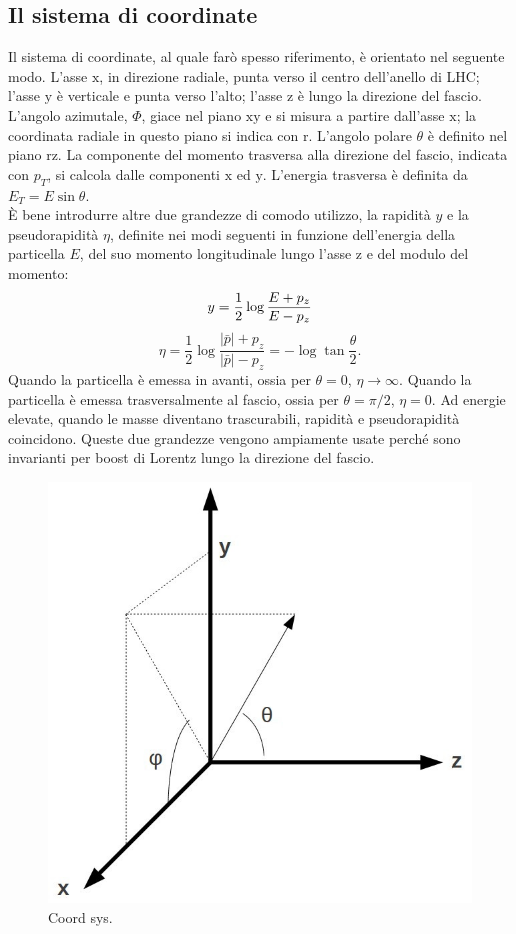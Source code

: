 \subsection{Il sistema di coordinate}
Il sistema di coordinate, al quale far\`o spesso riferimento, \`e orientato nel seguente modo. L'asse $\mathrm{x}$, in direzione radiale, punta verso il centro dell'anello di LHC; l'asse $\mathrm{y}$ \`e verticale e punta verso l'alto; l'asse $\mathrm{z}$ \`e lungo la direzione del fascio. L'angolo azimutale, $\Phi$, giace nel piano $\mathrm{xy}$ e si misura a partire dall'asse $\mathrm{x}$; la coordinata radiale in questo piano si indica con $\mathrm{r}$. L'angolo polare $\theta$ \`e definito nel piano $\mathrm{rz}$. La componente del momento trasversa alla direzione del fascio, indicata con $p_T$, si calcola dalle componenti $\mathrm{x}$ ed $\mathrm{y}$. L'energia trasversa \`e definita da $E_T = E \sin{\theta}$.\\
\`E bene introdurre altre due grandezze di comodo utilizzo, la rapidit\`a $y$ e la pseudorapidit\`a $\eta$, definite nei modi seguenti in funzione dell'energia della particella $E$, del suo momento longitudinale lungo l'asse $\mathrm{z}$ e del modulo del momento:
\begin{equation}
y = \frac{1}{2} \log{\frac{E + p_z}{E - p_z}}\\
\end{equation}
\begin{equation}
\eta = \frac{1}{2} \log{\frac{|\bar{p}| + p_z}{|\bar{p}| - p_z}} = -\log{\tan{\frac{\theta}{2}}}.
\end{equation}
Quando la particella \`e emessa in avanti, ossia per $\theta = 0$, $\eta \rightarrow \infty$. Quando la particella \`e emessa trasversalmente al fascio, ossia per $\theta = \pi /2$, $\eta = 0$. Ad energie elevate, quando le masse diventano trascurabili, rapidit\`a e pseudorapidit\`a coincidono. Queste due grandezze vengono ampiamente usate perch\'e sono invarianti per boost di Lorentz lungo la direzione del fascio.

\begin{figure}[!htb]
  \centering
    \includegraphics[width=.3\textwidth]{figures/CMS_CoordSys.jpg}
  \caption{Coord sys.}
  \label{fig:CMS_CoordSys}
\end{figure}

